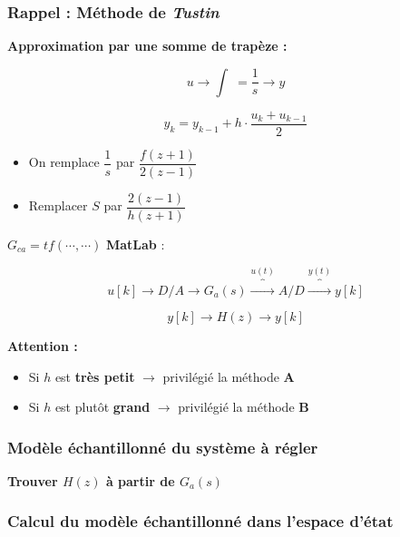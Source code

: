 \documentclass[document.tex]{subfiles}
\begin{document}
\subsubsection{Rappel : Méthode de \textit{Tustin}}

\textbf{Approximation par une somme de trapèze :}

$$ u \longrightarrow {\boxed{\int \; = \dfrac{1}{s}}} \longrightarrow y$$

$$ \boxed{ y_k = y_{k-1} + h\cdot \dfrac{u_k + u_{k-1}}{2} } $$

\begin{itemize}
\item On remplace $\boxed{\dfrac{1}{s}}$ par $\dfrac{f(z+1)}{2(z-1)}$\\
\item Remplacer $\boxed{S}$ par $\dfrac{2(z-1)}{h(z+1)}$
\end{itemize}

$\boxed{G_{ca} = tf(\cdots,\cdots)}$ \hfil \textbf{MatLab} : 

$$ u[k]\longrightarrow\boxed{D/A}\longrightarrow \boxed{G_a(s)} \overbrace{\longrightarrow}^{u(t)} \boxed{A/D} \overbrace{\longrightarrow}^{y(t)} y[k]$$


$$y[k] \longrightarrow \boxed{H(z)} \longrightarrow y[k] $$

\textbf{Attention : }\\
\begin{itemize}
\item Si \underline{$h$} est \textbf{très petit} $\rightarrow$ privilégié la méthode \textbf{A}
\item Si \underline{$h$} est plutôt \textbf{grand} $\rightarrow$ privilégié la méthode \textbf{B}   
\end{itemize}

\subsubsection{Modèle échantillonné du système à régler}


\begin{center}
\textbf{Trouver $H(z)$ à partir de $G_a(s)$}
\end{center}

\subsubsection{Calcul du modèle échantillonné dans l'espace d'état}
\end{document}
